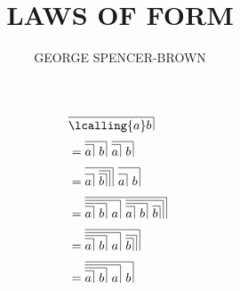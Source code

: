 \documentclass[11pt, a4paper]{book}
\title{LAWS OF FORM}
\author{GEORGE SPENCER-BROWN}
\newcommand\lcall[2][0]{%
    \hbox{%
        \vbox{
            \hrule
            \kern \dimexpr 2pt + #1\dimexpr 2.7pt\relax\relax
            \hbox{$#2$\,\footnotesize\strut}
        }%
        {\vrule depth 1pt}}\mskip7mu
}
\newcommand\lcross[2][0]{%
    \hbox{%
        \vbox{
            \hrule
            \kern \dimexpr 2pt + #1\dimexpr 2.7pt\relax\relax
            \hbox{$#2$\,\footnotesize\strut}
        }%
        {\vrule depth 1pt}}\mskip1mu
}
\begin{document}
\maketitle

\begin{align*}
     & \lcall{\lcalling{a}b}                               \\[0.5ex] 
     & = \lcall{\lcall{a}b}\lcall{\lcall{a}b} \\[0.5ex] 
     & = \lcall{\lcall{a}\lcross{\lcross{b}}}\lcall[1]{\lcall{a}b} \\[0.5ex] 
     & = \lcall{\lcall{\lcall{\lcall{a}b}a}\lcross{\lcall{\lcall{a}b}\lcross{b}}} \\[0.5ex]
     & = \lcall{\lcall{\lcall{\lcall{a}b}a}\lcross{\lcross{b}}}  \\[0.5ex]
     & = \lcall{\lcall{\lcall{\lcall{a}b}a}b}
\end{align*}
\end{document}
